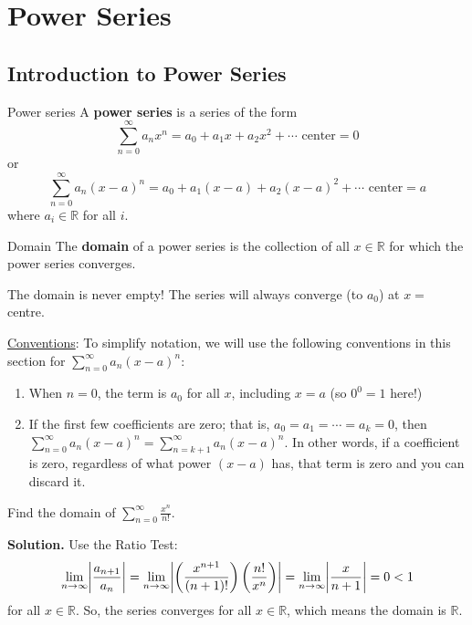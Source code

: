 \chapter{Power Series}
\section{Introduction to Power Series}
\begin{Definition}{Power series}{}
    A \textbf{power series} is a series of the form
    \[ \sum\limits_{n=0}^{\infty} a_n x^n=a_0+a_1x+a_2x^2+\cdots\text{ center}=0 \]
    or
    \[ \sum\limits_{n=0}^{\infty} a_n (x-a)^n=a_0+a_1(x-a)+a_2(x-a)^2+\cdots\text{ center}=a \]
    where $ a_i\in\mathbb{R} $ for all $ i $.
\end{Definition}
\begin{Definition}{Domain}{}
    The \textbf{domain} of a power series is the collection of all
    $ x\in\mathbb{R} $ for which the power series converges.
\end{Definition}

\begin{Remark}{}{}
    The domain is never empty! The series will always converge (to $ a_0 $)
    at $ x= $ centre.
\end{Remark}
\underline{Conventions}: To simplify notation, we will use the following
conventions in this section for $ \sum\limits_{n=0}^{\infty} a_n(x-a)^n $:
\begin{enumerate}
    \item When $ n=0 $, the term is $ a_0 $ for all $ x $, including $ x=a $
          (so $ 0^0=1 $ here!)
    \item If the first few coefficients are zero; that is, $ a_0=a_1=\cdots=a_k=0 $,
          then $ \sum\limits_{n=0}^{\infty} a_n(x-a)^n=\sum\limits_{n=k+1}^{\infty} a_n(x-a)^n $.
          In other words, if a coefficient is zero, regardless of what power
          $ (x-a) $ has, that term is zero and you can discard it.
\end{enumerate}

\begin{Example}{}{}
    Find the domain of $ \displaystyle \sum\limits_{n=0}^{\infty} \frac{x^n}{n!} $.

    \textbf{Solution.} Use the Ratio Test:
    \[ \lim\limits_{{n} \to {\infty}} \abs*{\frac{a_{n+1}}{a_n}}
        =\lim\limits_{{n} \to {\infty}} \abs*{\left( \frac{x^{n+1}}{(n+1)!} \right)
            \left( \frac{n!}{x^n} \right)}
        =\lim\limits_{{n} \to {\infty}} \abs*{\frac{x}{n+1}}
        =0
        <1 \]
    for all $ x\in\mathbb{R} $. So, the series converges for all $ x\in\mathbb{R} $,
    which means the domain is $ \mathbb{R} $.
\end{Example}

